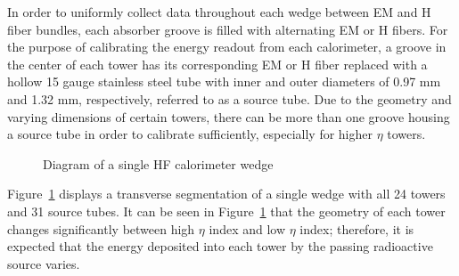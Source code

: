In order to uniformly collect data throughout each wedge between EM and H fiber bundles, each absorber groove is filled with alternating EM or H fibers. For the purpose of calibrating the energy readout from each calorimeter, a groove in the center of each tower has its corresponding EM or H fiber replaced with a hollow 15 gauge stainless steel tube with inner and outer diameters of 0.97 mm and 1.32 mm, respectively, referred to as a source tube. Due to the geometry and  varying dimensions of certain towers, there can be more than one groove housing a source tube in order to calibrate sufficiently, especially for higher $\eta$ towers.

\begin{figure}[!h]
   \begin{center}
      \caption{Diagram of a single HF calorimeter wedge}
      \label{fig:hf_description_wedgediagram}
   \end{center}
\end{figure}

Figure~\ref{fig:hf_description_wedgediagram} displays a transverse segmentation of a single wedge with all 24 towers and 31 source tubes. It can be seen in Figure~\ref{fig:hf_description_wedgediagram} that the geometry of each tower changes significantly between high $\eta$ index and low $\eta$ index; therefore, it is expected that the energy deposited into each tower by the passing radioactive source varies.

